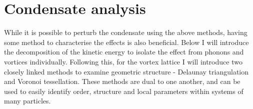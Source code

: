 {\section{Condensate analysis}\label{sec:con_analysis}
While it is possible to perturb the condensate using the above methods, having some method to characterise the effects is also beneficial. Below I will introduce the decomposition of the kinetic energy to isolate the effect from phonons and vortices individually. Following this, for the vortex lattice I will introduce two closely linked methods to examine geometric structure - Delaunay triangulation and Voronoi tessellation. These methods are dual to one another, and can be used to easily identify order, structure and local parameters within systems of many particles.

}
